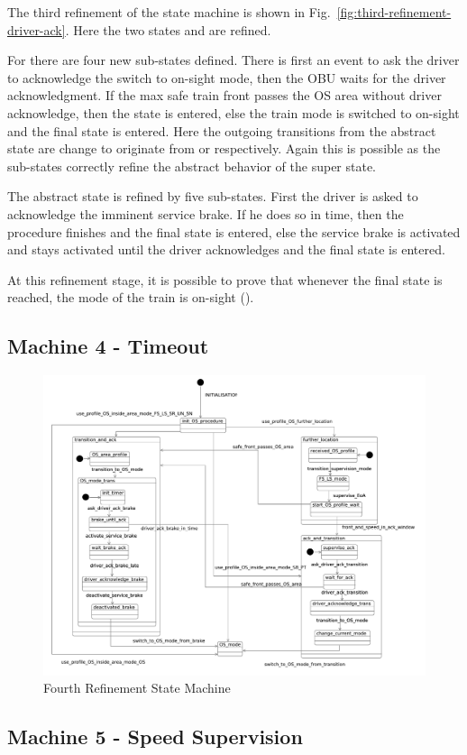 \documentclass{template/openetcs_article}
\begin{document}
The third refinement of the state machine is shown in
Fig.~\ref{fig:third-refinement-driver-ack}. Here the two states
 and  are refined. 

For  there are four new sub-states defined. There is
first an event to ask the driver to acknowledge the switch to on-sight mode,
then the OBU waits for the driver acknowledgment. If the max safe train front
passes the OS area without driver acknowledge, then the
 state is entered, else the train mode is switched to
on-sight and the final state is entered. Here the outgoing transitions from the
abstract  state are change to originate from
 or  respectively. Again this
is possible as the sub-states correctly refine the abstract behavior of the
super state.

The abstract  state is refined by five sub-states. First
the driver is asked to acknowledge the imminent service brake. If he does so in
time, then the procedure finishes and the final state is entered, else the
service brake is activated and stays activated until the driver acknowledges and
the final state is entered.

At this refinement stage, it is possible to prove that whenever the final state
is reached, the mode of the train is on-sight ().

{\footnotesize

}

\subsection{Machine 4 - Timeout}
\label{sec:machine-4-timeout}


\begin{figure}[ht]
  \centering
  \includegraphics[width=.95\textwidth]{m4_timeout_on_sight_procedure}
  \caption{Fourth Refinement State Machine}
  \label{fig:fourth-refinement-state-machine}
\end{figure}

{\footnotesize

}

\subsection{Machine 5 - Speed Supervision}
\label{sec:machine-5-speed}

{\footnotesize

}



\end{document}
